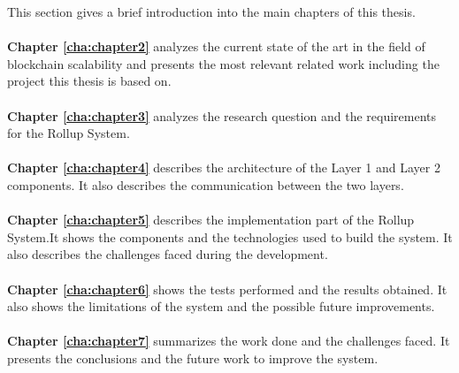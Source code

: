This section gives a brief introduction into the main chapters of this thesis. 
\\
\\
\textbf{Chapter \ref{cha:chapter2}} analyzes the current state of the art in the field of blockchain scalability and presents the most relevant related work including the project this thesis is based on.
\\
\\
\textbf{Chapter \ref{cha:chapter3}} analyzes the research question and the requirements for the Rollup System.
\\
\\
\textbf{Chapter \ref{cha:chapter4}} describes the architecture of the Layer 1 and Layer 2 components. It also describes the communication between the two layers.
\\
\\
\textbf{Chapter \ref{cha:chapter5}} describes the implementation part of the Rollup System.It shows the components and the technologies used to build the system. It also describes the challenges faced during the development.
\\
\\
\textbf{Chapter \ref{cha:chapter6}} shows the tests performed and the results obtained. It also shows the limitations of the system and the possible future improvements.
\\
\\
\textbf{Chapter \ref{cha:chapter7}} summarizes the work done and the challenges faced. It presents the conclusions and the future work to improve the system.
